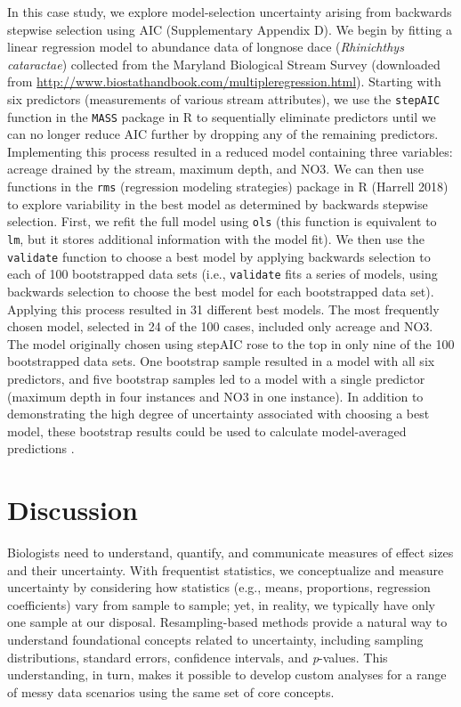 \documentclass[fleqn,10pt]{wlpeerj} %
\begin{document}
In this case study, we explore model-selection uncertainty arising from backwards stepwise selection using AIC (Supplementary Appendix D). We begin by fitting a linear regression model to abundance data of longnose dace (\emph{Rhinichthys cataractae}) collected from the Maryland Biological Stream Survey (downloaded from \url{http://www.biostathandbook.com/multipleregression.html}). Starting with six predictors (measurements of various stream attributes), we use the \texttt{stepAIC} function in the \texttt{MASS} package in R \citep{Venables2013} to sequentially eliminate predictors until we can no longer reduce AIC further by dropping any of the remaining predictors. Implementing this process resulted in a reduced model containing three variables: acreage drained by the stream, maximum depth, and NO3. We can then use functions in the \texttt{rms} (regression modeling strategies) package in R (Harrell 2018) to explore variability in the best model as determined by backwards stepwise selection. First, we refit the full model using \texttt{ols} (this function is equivalent to \texttt{lm}, but it stores additional information with the model fit). We then use the \texttt{validate} function to choose a best model by applying backwards selection to each of 100 bootstrapped data sets (i.e., \texttt{validate} fits a series of models, using backwards selection to choose the best model for each bootstrapped data set). Applying this process resulted in 31 different best models. The most frequently chosen model, selected in 24 of the 100 cases, included only acreage and NO3. The model originally chosen using stepAIC rose to the top in only nine of the 100 bootstrapped data sets. One bootstrap sample resulted in a model with all six predictors, and five bootstrap samples led to a model with a single predictor (maximum depth in four instances and NO3 in one instance). In addition to demonstrating the high degree of uncertainty associated with choosing a best model, these bootstrap results could be used to calculate model-averaged predictions \citep[using the frequency with which a model was selected to determine model weights;][]{buckland1997model}.

\hypertarget{discussion}{%
\section*{Discussion}\label{discussion}}

Biologists need to understand, quantify, and communicate measures of effect sizes and their uncertainty. With frequentist statistics, we conceptualize and measure uncertainty by considering how statistics (e.g., means, proportions, regression coefficients) vary from sample to sample; yet, in reality, we typically have only one sample at our disposal. Resampling-based methods provide a natural way to understand foundational concepts related to uncertainty, including sampling distributions, standard errors, confidence intervals, and \emph{p}-values. This understanding, in turn, makes it possible to develop custom analyses for a range of messy data scenarios using the same set of core concepts.
\end{document}
